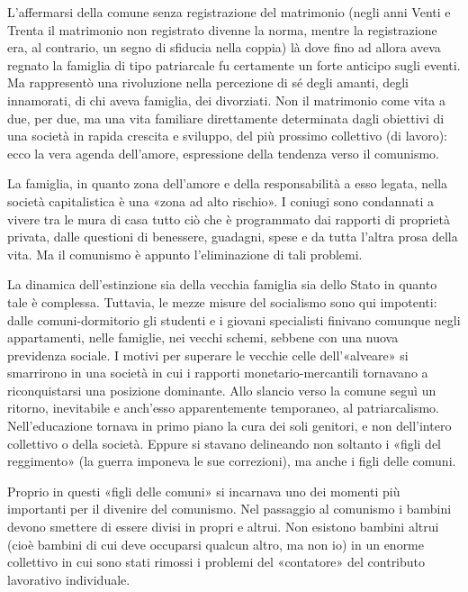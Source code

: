 \documentclass[12pt,a4paper,openany]{book}
\begin{document}
L'affermarsi della comune senza registrazione del matrimonio (negli anni Venti e Trenta il matrimonio non registrato divenne la norma, mentre la registrazione era, al contrario, un segno di sfiducia nella coppia) là dove fino ad allora aveva regnato la famiglia di tipo patriarcale fu certamente un forte anticipo sugli eventi. Ma rappresentò una rivoluzione nella percezione di sé degli amanti, degli innamorati, di chi aveva famiglia, dei divorziati. Non il matrimonio come vita a due, per due, ma una vita familiare direttamente determinata dagli obiettivi di una società in rapida crescita e sviluppo, del più prossimo collettivo (di lavoro): ecco la vera agenda dell'amore, espressione della tendenza verso il comunismo.

La famiglia, in quanto zona dell'amore e della responsabilità a esso legata, nella società capitalistica è una «zona ad alto rischio». I coniugi sono condannati a vivere tra le mura di casa tutto ciò che è programmato dai rapporti di proprietà privata, dalle questioni di benessere, guadagni, spese e da tutta l'altra prosa della vita. Ma il comunismo è appunto l'eliminazione di tali problemi.

La dinamica dell'estinzione sia della vecchia famiglia sia dello Stato in quanto tale è complessa. Tuttavia, le mezze misure del socialismo sono qui impotenti: dalle comuni-dormitorio gli studenti e i giovani specialisti finivano comunque negli appartamenti, nelle famiglie, nei vecchi schemi, sebbene con una nuova previdenza sociale. I motivi per superare le vecchie celle dell'«alveare» si smarrirono in una società in cui i rapporti monetario-mercantili tornavano a riconquistarsi una posizione dominante. Allo slancio verso la comune seguì un ritorno, inevitabile e anch'esso apparentemente temporaneo, al patriarcalismo. Nell'educazione tornava in primo piano la cura dei soli genitori, e non dell'intero collettivo o della società. Eppure si stavano delineando non soltanto i «figli del reggimento» (la guerra imponeva le sue correzioni), ma anche i figli delle comuni.

Proprio in questi «figli delle comuni» si incarnava uno dei momenti più importanti per il divenire del comunismo. Nel passaggio al comunismo i bambini devono smettere di essere divisi in propri e altrui. Non esistono bambini altrui (cioè bambini di cui deve occuparsi qualcun altro, ma non io) in un enorme collettivo in cui sono stati rimossi i problemi del «contatore» del contributo lavorativo individuale.
\end{document}
